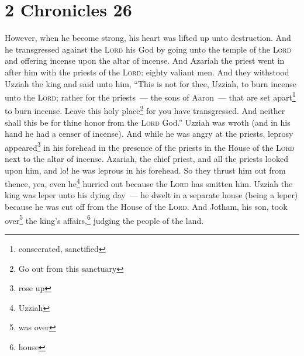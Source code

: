 \section{2 Chronicles 26}\label{2 Chronicles 26}
\begin{enumerate}
     However, when he become strong, his heart was lifted up unto destruction. And he transgressed against the \textsc{Lord} his God by going unto the temple of the \textsc{Lord} and offering incense upon the altar of incense.%
     And Azariah the priest went in after him with the priests of the \textsc{Lord}: eighty valiant men.%
     And they withstood Uzziah the king and said unto him, ``This is not for thee, Uzziah, to burn incense unto the \textsc{Lord}; rather for the priests~--- the sons of Aaron~--- that are set apart\footnote{consecrated, sanctified} to burn incense. Leave this holy place\footnote{Go out from this sanctuary} for you have transgressed. And neither shall this be for thine honor from the \textsc{Lord} God.''%
     Uzziah was wroth (and in his hand he had a censer of incense). And while he was angry at the priests, leprosy appeared\footnote{rose up} in his forehead in the presence of the priests in the House of the \textsc{Lord} next to the altar of incense.%
     Azariah, the chief priest, and all the priests looked upon him, and lo! he was leprous in his forehead. So they thrust him out from thence, yea, even he\footnote{Uzziah} hurried out because the \textsc{Lord} has smitten him.%
     Uzziah the king was leper unto his dying day~--- he dwelt in a separate house (being a leper) because he was cut off from the House of the \textsc{Lord}. And Jotham, his son, took over\footnote{was over} the king's affairs,\footnote{house} judging the people of the land.%
\end{enumerate}
